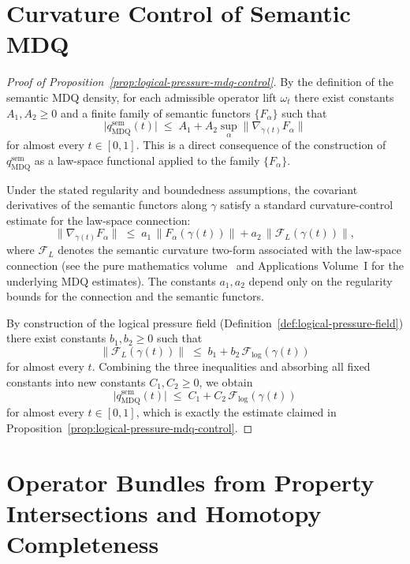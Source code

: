 \documentclass[11pt]{book}
\theoremstyle{plain}
\theoremstyle{definition}
\theoremstyle{remark}
\begin{document}
\section[Curvature Control of Semantic MDQ]{Curvature Control of Semantic MDQ}
\label{app:sec-logical-pressure-mdq-proof}

\begin{proof}[Proof of Proposition~\ref{prop:logical-pressure-mdq-control}]
By the definition of the semantic MDQ density, for each admissible
operator lift $\omega_t$ there exist constants $A_1, A_2 \ge 0$ and a
finite family of semantic functors $\{F_\alpha\}$ such that
\[
  \bigl|q_{\mathrm{MDQ}}^{\mathrm{sem}}(t)\bigr|
  \;\le\;
  A_1 + A_2
  \sup_\alpha
  \bigl\|
    \nabla_{\dot{\gamma}(t)} F_\alpha
  \bigr\|
\]
for almost every $t\in[0,1]$. This is a direct consequence of the
construction of $q_{\mathrm{MDQ}}^{\mathrm{sem}}$ as a law-space
functional applied to the family $\{F_\alpha\}$.

Under the stated regularity and boundedness assumptions, the covariant
derivatives of the semantic functors along $\gamma$ satisfy a standard
curvature-control estimate for the law-space connection:
\[
  \bigl\|
    \nabla_{\dot{\gamma}(t)} F_\alpha
  \bigr\|
  \;\le\;
  a_1\,\bigl\|F_\alpha(\gamma(t))\bigr\|
  +
  a_2\,\bigl\|\mathcal{F}_L(\gamma(t))\bigr\|,
\]
where $\mathcal{F}_L$ denotes the semantic curvature two-form
associated with the law-space connection (see the pure mathematics
volume~\cite{GaoZheng2025GFramework} and Applications Volume~I for the
underlying MDQ estimates). The constants $a_1,a_2$ depend only on the
regularity bounds for the connection and the semantic functors.

By construction of the logical pressure field
(Definition~\ref{def:logical-pressure-field}) there exist constants
$b_1, b_2 \ge 0$ such that
\[
  \bigl\|\mathcal{F}_L(\gamma(t))\bigr\|
  \;\le\;
  b_1 + b_2\,\mathcal{F}_{\mathrm{log}}(\gamma(t))
\]
for almost every $t$. Combining the three inequalities and absorbing
all fixed constants into new constants $C_1, C_2 \ge 0$, we obtain
\[
  \bigl|q_{\mathrm{MDQ}}^{\mathrm{sem}}(t)\bigr|
  \;\le\;
  C_1 + C_2\,\mathcal{F}_{\mathrm{log}}(\gamma(t))
\]
for almost every $t \in [0,1]$, which is exactly the estimate claimed
in Proposition~\ref{prop:logical-pressure-mdq-control}.
\end{proof}

\section[Operator Bundles from Property Intersections]{Operator Bundles from Property Intersections and Homotopy Completeness}
\label{app:sec-operator-bundles}
\end{document}
